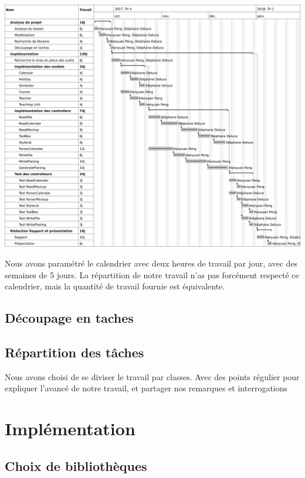 \documentclass{polytech/polytech}
\begin{document}
	\includegraphics[width=\textwidth]{./img/Gantt.png}
	
	Nous avons paramétré le calendrier avec deux heures de travail par jour, avec des semaines de 5 jours.
	La répartition de notre travail n'as pas forcément respecté ce calendrier, mais la quantité de travail fournie est équivalente.

	\section{Découpage en taches}

	\section{Répartition des tâches}

	Nous avons choisi de se diviser le travail par classes.
	Avec des points régulier pour expliquer l'avancé de notre travail, et partager nos remarques et
	interrogations

	\chapter{Implémentation}
	
	\section{Choix de bibliothèques}
	
	
\end{document}
